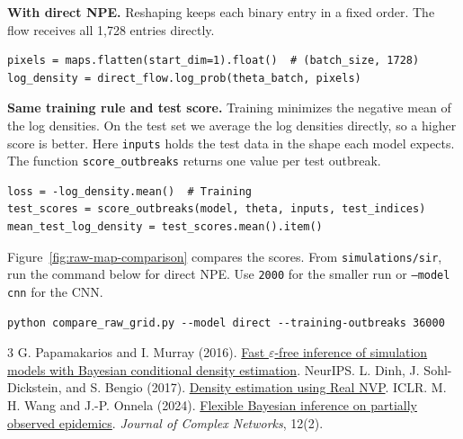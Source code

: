 \documentclass[11pt]{article}
\begin{document}
\textbf{With direct NPE.}
Reshaping keeps each binary entry in a fixed order. The flow receives all
1{,}728 entries directly.

\begin{lstlisting}[style=sircode]
pixels = maps.flatten(start_dim=1).float()  # (batch_size, 1728)
log_density = direct_flow.log_prob(theta_batch, pixels)
\end{lstlisting}

\textbf{Same training rule and test score.}
Training minimizes the negative mean of the log densities. On the test
set we average the log densities directly, so a higher score is better.
Here \texttt{inputs} holds the test data in the shape each model expects.
The function \texttt{score\_outbreaks} returns one value per test outbreak.

\begin{lstlisting}[style=sircode]
loss = -log_density.mean()  # Training
test_scores = score_outbreaks(model, theta, inputs, test_indices)
mean_test_log_density = test_scores.mean().item()
\end{lstlisting}

Figure~\ref{fig:raw-map-comparison} compares the scores. From
\nolinkurl{simulations/sir}, run the command below for direct NPE. Use
\texttt{2000} for the smaller run or \texttt{--model cnn} for the CNN.

\begin{lstlisting}[style=sircode,language={}]
python compare_raw_grid.py --model direct --training-outbreaks 36000
\end{lstlisting}

\begin{thebibliography}{3}
\small
\setlength{\itemsep}{0pt}
 G. Papamakarios and I. Murray (2016).
\href{https://proceedings.neurips.cc/paper/2016/hash/6aca97005c68f1206823815f66102863-Abstract.html}{Fast $\varepsilon$-free inference of simulation models with Bayesian conditional density estimation}.
NeurIPS.
 L. Dinh, J. Sohl-Dickstein, and S. Bengio (2017).
\href{https://arxiv.org/abs/1605.08803}{Density estimation using Real NVP}. ICLR.
 M. H. Wang and J.-P. Onnela (2024).
\href{https://doi.org/10.1093/comnet/cnae017}{Flexible Bayesian inference on partially observed epidemics}. \emph{Journal of Complex Networks}, 12(2).
\end{thebibliography}
\end{document}
